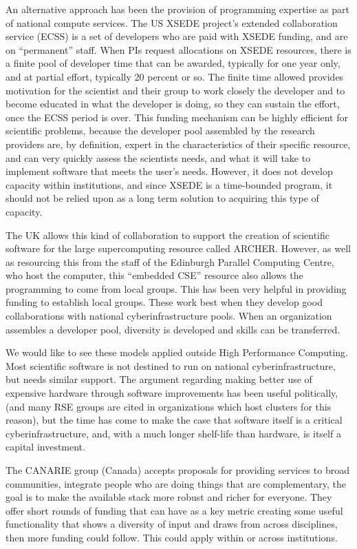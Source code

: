 An alternative approach has been the provision of programming expertise as
part of national compute services. The US XSEDE project's extended collaboration
service (ECSS) is a set of developers who are paid with XSEDE funding, and are on 
``permanent'' staff.  When PIs request allocations on XSEDE resources, there is a 
finite pool of developer time that can be awarded, typically for one year only, 
and at partial effort, typically 20 percent or so. The finite time allowed provides
motivation for the scientist and their group to work closely the developer and to 
become educated in what the developer is doing, so they can sustain the effort, once 
the ECSS period is over. This funding mechanism can be highly efficient for scientific
problems, because the developer pool assembled by the research providers are, by definition, 
expert in the characteristics of their specific resource, and can very quickly assess the
scientists needs, and what it will take to implement software that meets the user's needs. 
However, it does not develop capacity within institutions, and since XSEDE is a time-bounded
program, it should not be relied upon as a long term solution to acquiring this type of capacity.

The UK allows this kind of collaboration to support the creation of scientific
software for the large supercomputing resource called ARCHER.
However, as well as resourcing this from the staff of the Edinburgh Parallel
Computing Centre, who host the computer, this ``embedded CSE'' resource also
allows the programming to come from local groups. This has been very helpful
in providing funding to establish local groups. These work best when they
develop good collaborations with national cyberinfrastructure pools.
When an organization assembles a developer pool, diversity is developed and 
skills can be transferred.

We would like to see these models applied outside High Performance Computing.
Most scientific software is not destined to run on national cyberinfrastructure,
but needs similar support. The argument regarding making better use of expensive
hardware through software improvements has been useful politically, (and many
RSE groups are cited in organizations which host clusters for this reason), but
the time has come to make the case that software itself is a critical
cyberinfrastructure, and, with a much longer shelf-life than hardware, is itself
a capital investment.

The CANARIE group (Canada) accepts proposals for providing services to broad communities, 
integrate people who are doing things that are complementary, the goal is to make the available 
stack more robust and richer for everyone. They offer short rounds of funding that can
have as a key metric creating some useful functionality that shows a diversity
of input and draws from across disciplines, then more funding could follow. This
could apply within or across institutions.

